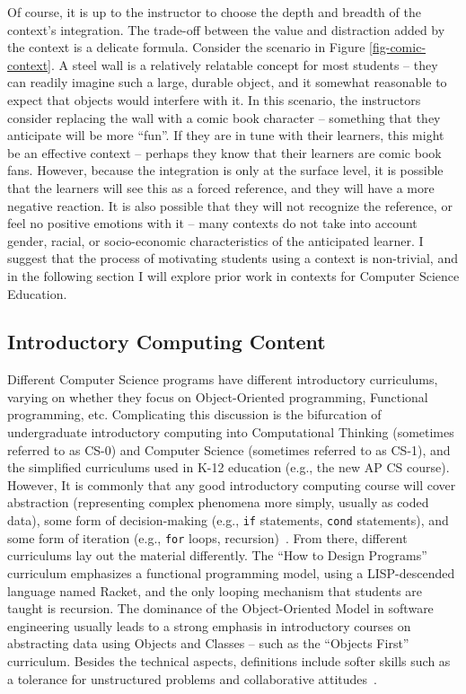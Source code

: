 Of course, it is up to the instructor to choose the depth and breadth of the context's integration.
The trade-off between the value and distraction added by the context is a delicate formula.
Consider the scenario in Figure \ref{fig-comic-context}.
A steel wall is a relatively relatable concept for most students -- they can readily imagine such a large, durable object, and it somewhat reasonable to expect that objects would interfere with it.
In this scenario, the instructors consider replacing the wall with a comic book character -- something that they anticipate will be more ``fun''.
If they are in tune with their learners, this might be an effective context -- perhaps they know that their learners are comic book fans.
However, because the integration is only at the surface level, it is possible that the learners will see this as a forced reference, and they will have a more negative reaction.
It is also possible that they will not recognize the reference, or feel no positive emotions with it -- many contexts do not take into account gender, racial, or socio-economic characteristics of the anticipated learner.
I suggest that the process of motivating students using a context is non-trivial, and in the following section I will explore prior work in contexts for Computer Science Education.

\subsection{Introductory Computing Content}

Different Computer Science programs have different introductory curriculums, varying on whether they focus on Object-Oriented programming, Functional programming, etc. 
Complicating this discussion is the bifurcation of undergraduate introductory computing into Computational Thinking (sometimes referred to as CS-0) and Computer Science (sometimes referred to as CS-1), and the simplified curriculums used in K-12 education (e.g., the new AP CS course).
However, It is commonly that any good introductory computing course will cover abstraction (representing complex phenomena more simply, usually as coded data), some form of decision-making (e.g., \texttt{if} statements, \texttt{cond} statements), and some form of iteration (e.g., \texttt{for} loops, recursion)~\cite{Kramer:2007, CS2013, csta-computational-thinking}.
From there, different curriculums lay out the material differently.
The ``How to Design Programs'' curriculum emphasizes a functional programming model, using a LISP-descended language named Racket, and the only looping mechanism that students are taught is recursion.
The dominance of the Object-Oriented Model in software engineering usually leads to a strong emphasis in introductory courses on abstracting data using Objects and Classes -- such as the ``Objects First'' curriculum.
Besides the technical aspects, definitions include softer skills such as a tolerance for unstructured problems and collaborative attitudes~\cite{csta-computational-thinking, google-computational-thinking}.

